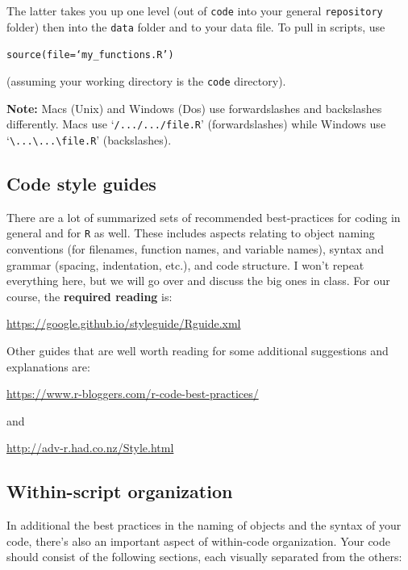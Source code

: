 \documentclass[12pt,letterpaper]{article}
\begin{document}
The latter takes you up one level (out of \texttt{code} into your general \texttt{repository} folder) then into the \texttt{data} folder and to your data file.  To pull in scripts, use 

\texttt{source(file=`my\_functions.R')}

(assuming your working directory is the \texttt{code} directory).

\textbf{Note:} Macs (Unix) and Windows (Dos) use forwardslashes and backslashes differently.  Macs use `\texttt{/.../.../file.R}' (forwardslashes) while Windows use `\texttt{\textbackslash...\textbackslash...\textbackslash file.R}' (backslashes).


\subsection{Code style guides} \label{codestyleguide}
There are a lot of summarized sets of recommended best-practices for coding in general and for \texttt{R} as well.  These includes aspects relating to object naming conventions (for filenames, function names, and variable names), syntax and grammar (spacing, indentation, etc.), and code structure.  I won't repeat everything here, but we will go over and discuss the big ones in class.  For our course, the \textbf{required reading} is:

\url{https://google.github.io/styleguide/Rguide.xml}

Other guides that are well worth reading for some additional suggestions and explanations are:

\url{https://www.r-bloggers.com/r-code-best-practices/}

and 

\url{http://adv-r.had.co.nz/Style.html}


\subsection{Within-script organization}
In additional the best practices in the naming of objects and the syntax of your code, there's also an important aspect of within-code organization. Your code should consist of the following sections, each visually separated from the others:
\end{document}
